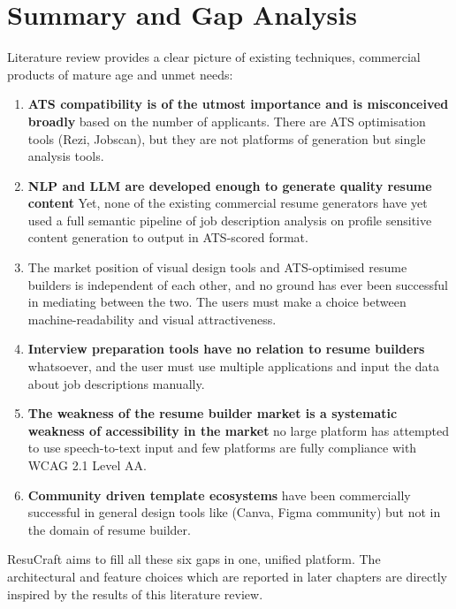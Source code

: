 \documentclass[12pt, a4paper, oneside]{report}
\begin{document}
\section{Summary and Gap Analysis}

Literature review provides a clear picture of existing techniques, commercial products of mature age and unmet needs:

\begin{enumerate}
   \item \textbf{ATS compatibility is of the utmost importance and is misconceived broadly} based on the number of applicants. There are ATS optimisation tools (Rezi, Jobscan), but they are not platforms of generation but single analysis tools\cite{jobscan2021}.

 \item \textbf{NLP and LLM are developed enough to generate quality resume content} Yet, none of the existing commercial resume generators have yet used a full semantic pipeline of job description analysis on profile sensitive content generation to output in ATS-scored format\cite{vaswani2017}\cite{brown2020}.

    \item The market position of visual design tools and ATS-optimised resume builders is independent of each other, and no ground has ever been successful in mediating between the two. The users must make a choice between machine-readability and visual attractiveness.

    \item \textbf{Interview preparation tools have no relation to resume builders} whatsoever, and the user must use multiple applications and input the data about job descriptions manually\cite{resumeworded2022}.

    \item \textbf{The weakness of the resume builder market is a systematic weakness of accessibility in the market} no large platform has attempted to use speech-to-text input and few platforms are fully compliance with WCAG 2.1 Level AA.

    \item \textbf{Community driven template ecosystems} have been commercially successful in general design tools like (Canva, Figma community) but not in the domain of resume builder.
\end{enumerate}

ResuCraft aims to fill all these six gaps in one, unified platform. The architectural and feature choices which are reported in later chapters are directly inspired by the results of this literature review.
\end{document}
